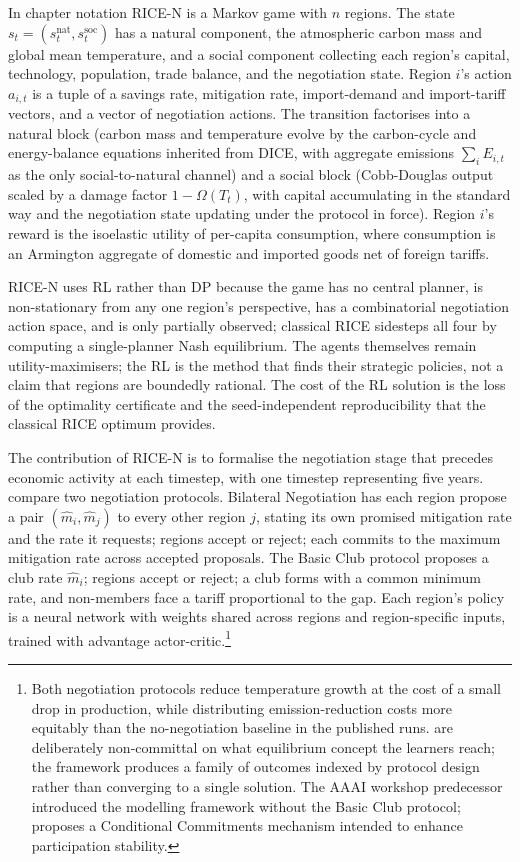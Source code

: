 In chapter notation RICE-N is a Markov game with $n$ regions. The
state $s_t = (s^{\mathrm{nat}}_t, s^{\mathrm{soc}}_t)$ has a natural
component, the atmospheric carbon mass and global mean temperature,
and a social component collecting each region's capital, technology,
population, trade balance, and the negotiation state. Region $i$'s
action $a_{i,t}$ is a tuple of a savings rate, mitigation rate,
import-demand and import-tariff vectors, and a vector of negotiation
actions. The transition factorises into a natural block (carbon mass
and temperature evolve by the carbon-cycle and energy-balance
equations inherited from DICE, with aggregate emissions
$\sum_i E_{i,t}$ as the only social-to-natural channel) and a social
block (Cobb-Douglas output scaled by a damage factor
$1 - \Omega(T_t)$, with capital accumulating in the standard way and
the negotiation state updating under the protocol in force). Region
$i$'s reward is the isoelastic utility of per-capita consumption,
where consumption is an Armington aggregate of domestic and imported
goods net of foreign tariffs.

RICE-N uses RL rather than DP because the game has no central
planner, is non-stationary from any one region's perspective, has a
combinatorial negotiation action space, and is only partially
observed; classical RICE sidesteps all four by computing a
single-planner Nash equilibrium. The agents themselves remain
utility-maximisers; the RL is the method that finds their strategic
policies, not a claim that regions are boundedly rational. The cost
of the RL solution is the loss of the optimality certificate and the
seed-independent reproducibility that the classical RICE optimum
provides.

The contribution of RICE-N is to formalise the negotiation stage
that precedes economic activity at each timestep, with one timestep
representing five years. \citet{Zhang2025ricen} compare two
negotiation protocols. Bilateral Negotiation has each region propose
a pair $(\hat{m}_i, \hat{m}_j)$ to every other region $j$, stating
its own promised mitigation rate and the rate it requests; regions
accept or reject; each commits to the maximum mitigation rate across
accepted proposals. The Basic Club protocol \citep{Nordhaus2015climateclubs}
proposes a club rate $\hat{m}_i$; regions accept or reject; a club
forms with a common minimum rate, and non-members face a tariff
proportional to the gap. Each region's policy is a neural network
with weights shared across regions and region-specific inputs,
trained with advantage actor-critic.\footnote{Both negotiation
protocols reduce temperature growth at the cost of a small drop in
production, while distributing emission-reduction costs more
equitably than the no-negotiation baseline in the published runs.
\citet{Zhang2025ricen} are deliberately non-committal on what
equilibrium concept the learners reach; the framework produces a
family of outcomes indexed by protocol design rather than converging
to a single solution. The AAAI workshop predecessor
\citep{Zhang2022ricen} introduced the modelling framework without
the Basic Club protocol; \citet{Heitzig2023ccf} proposes a Conditional
Commitments mechanism intended to enhance participation stability.}

